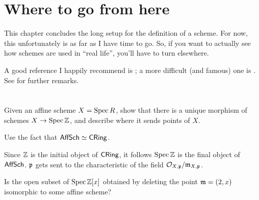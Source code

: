 \section{Where to go from here}
This chapter concludes the long setup for the definition of a scheme.
For now, this unfortunately is as far as I have time to go.
So, if you want to actually see how schemes are used in ``real life'',
you'll have to turn elsewhere.

A good reference I happily recommend is \cite{ref:gathmann};
a more difficult (and famous) one is \cite{ref:vakil}.
See  for further remarks.

\section{\problemhead}
\begin{problem}
	Given an affine scheme $X = \operatorname{Spec} R$,
	show that there is a unique morphism of schemes $X \to \operatorname{Spec} \mathbb Z$,
	and describe where it sends points of $X$.
	\begin{hint}
		Use the fact that $\mathsf{AffSch} \simeq \mathsf{CRing}$.
	\end{hint}
	\begin{sol}
		Since $\mathbb Z$ is the initial object of $\mathsf{CRing}$,
		it follows $\operatorname{Spec} \mathbb Z$ is the final object of $\mathsf{AffSch}$.
		$\mathfrak p$ gets sent to the characteristic of the field $\mathcal O_{X,\mathfrak p} / \mathfrak m_{X,\mathfrak p}$.
	\end{sol}
\end{problem}

\begin{problem}
	Is the open subset of $\operatorname{Spec} \mathbb Z[x]$
	obtained by deleting the point $\mathfrak m = (2,x)$
	isomorphic to some affine scheme?
\end{problem}

\endinput

